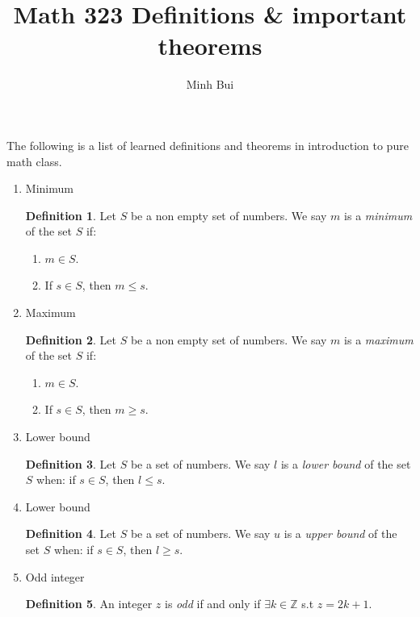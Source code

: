 \documentclass{article}
\author{Minh Bui}
\title{Math 323 Definitions \& important theorems}
\theoremstyle{claim}
\theoremstyle{definition}
\newtheorem{definition}{Definition}
\begin{document}
\maketitle
The following is a list of learned definitions and theorems in introduction to pure math class.
\begin{enumerate}
    \item[1.] Minimum
        \begin{definition}
            Let $S$ be a non empty set of numbers. We say $m$ is a \emph{minimum} of the set $S$ if:
            \begin{enumerate}
                \item[1.] $m \in S$.
                \item[2.] If $s \in S$, then $m \le s$.
            \end{enumerate}
        \end{definition}
    \item[2.] Maximum
        \begin{definition}
            Let $S$ be a non empty set of numbers. We say $m$ is a \emph{maximum} of the set $S$ if:
            \begin{enumerate}
                \item[1.] $m \in S$.
                \item[2.] If $s \in S$, then $m \ge s$.
            \end{enumerate}
        \end{definition}
    \item[3.] Lower bound
        \begin{definition}
            Let $S$ be a set of numbers. We say $l$ is a \emph{lower bound} of the set $S$ when: if $s \in S$, then $l \le s$.
        \end{definition}

    \item[4.] Lower bound
        \begin{definition}
            Let $S$ be a set of numbers. We say $u$ is a \emph{upper bound} of the set $S$ when: if $s \in S$, then $l \ge s$.
        \end{definition}
    
    \item[5.] Odd integer
        \begin{definition}
            An integer $z$ is \emph{odd} if and only if $\exists k \in \mathbb{Z}$ s.t $z = 2k + 1$.
        \end{definition}


\end{enumerate}
\end{document}

